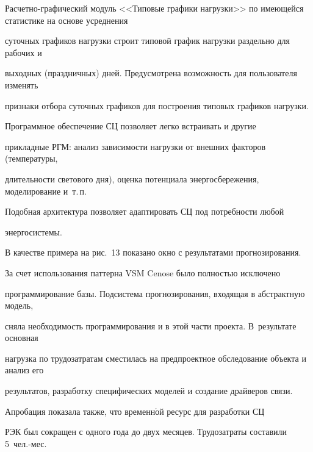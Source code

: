   


      Расчетно-графический модуль <<Типовые графики нагрузки>> по имеющейся статистике на основе усреднения 


суточных графиков нагрузки строит типовой график нагрузки раздельно для рабочих и 


выходных (праздничных) дней. Преду\-смот\-рена возможность для пользователя изменять 


признаки отбора суточных графиков для построения типовых графиков нагрузки.


  


  Программное обеспечение СЦ позволяет легко встраивать и другие 


прикладные РГМ: анализ зависимости нагрузки от внешних факторов (температуры, 


длительности светового дня), оценка потенциала энергосбережения, моделирование и~т.\,п. 


Подобная архитектура позволяет адаптировать СЦ под потребности любой 


энер\-го\-сис\-темы.


  


  В качестве примера на рис.~13 показано окно с результатами прогнозирования.


  





  


  За счет использования паттерна VSM Cenose было полностью исключено 


программирование базы. Под\-сис\-те\-ма прогнозирования, входящая в абстрактную модель, 


сняла необходимость программирования и в этой части проекта. В~результате основная 


нагрузка по трудозатратам сместилась на предпроектное обследование объекта и анализ его 


результатов, разработку специфических моделей и создание драйверов связи.


  


  Апробация показала также, что временн$\acute{\mbox{о}}$й ресурс для разработки СЦ


РЭК был сокращен с одного года до двух месяцев. Трудозатраты составили 5~чел.-мес. 


  



